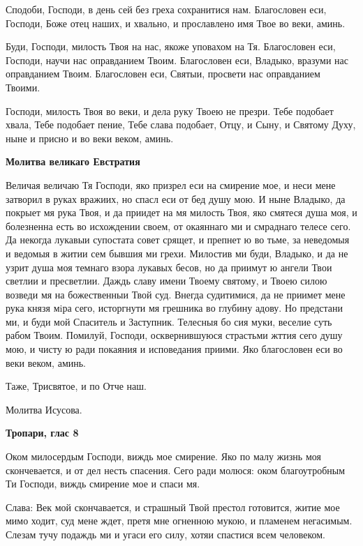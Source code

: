 Сподоби, Господи, в день сей без греха сохранитися нам. Благословен еси, Господи, Боже отец наших, и хвально, и прославлено имя Твое во веки, аминь.


Буди, Господи, милость Твоя на нас, якоже уповахом на Тя. Благословен еси, Господи, научи нас оправданием Твоим. Благословен еси, Владыко, вразуми нас оправданием Твоим. Благословен еси, Святыи, просвети нас оправданием Твоими.


Господи, милость Твоя во веки, и дела руку Твоею не презри. Тебе подобает хвала, Тебе подобает пение, Тебе слава подобает, Отцу, и Сыну, и Святому Духу, ныне и присно и во веки веком, аминь.





\bfseries Молитва великаго Евстратия\normalfont{}


Величая величаю Тя Господи, яко призрел еси на смирение мое, и неси мене затворил в руках вражиих, но спасл еси от бед душу мою. И ныне Владыко, да покрыет мя рука Твоя, и да приидет на мя милость Твоя, яко смятеся душа моя, и болезненна есть во исхождении своем, от окаяннаго ми и смраднаго телесе сего. Да некогда лукавыи супостата совет срящет, и препнет ю во тьме, за неведомыя и ведомыя в житии сем бывшия ми грехи. Милостив ми буди, Владыко, и да не узрит душа моя темнаго взора лукавых бесов, но да приимут ю ангели Твои светлии и пресветлии. Даждь славу имени Твоему святому, и Твоею силою возведи мя на божественныи Твой суд. Внегда судитимися, да не приимет мене рука князя мiра сего, исторгнути мя грешника во глубину адову. Но предстани ми, и буди мой Спаситель и Заступник. Телесныя бо сия муки, веселие суть рабом Твоим. Помилуй, Господи, осквернившуюся страстьми жттия сего душу мою, и чисту ю ради покаяния и исповедания приими. Яко благословен еси во веки веком, аминь.


Таже, Трисвятое, и по Отче наш.


Молитва Исусова.





\bfseries Тропари, глас 8\normalfont{}


Оком милосердым Господи, виждь мое смирение. Яко по малу жизнь моя скончевается, и от дел несть спасения. Сего ради молюся: оком благоутробным Ти Господи, виждь смирение мое и спаси мя.


Слава: Век мой скончавается, и страшный Твой престол готовится, житие мое мимо ходит, суд мене ждет, претя мне огненною мукою, и пламенем негасимым. Слезам тучу подаждь ми и угаси его силу, хотяи спастися всем человеком.



